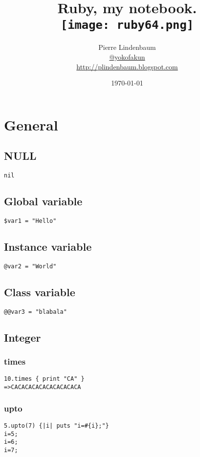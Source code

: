 \documentclass{article}
\date{\today}
\title{Ruby, my notebook.\\\texttt{[image: ruby64.png]}}
\author{Pierre Lindenbaum\\\href{https://twitter.com/yokofakun}{@yokofakun}\\\url{http://plindenbaum.blogspot.com} }
\begin{document}
\maketitle

\tableofcontents

\section{General}
\subsection{NULL}
\begin{lstlisting}
nil
\end{lstlisting}

\subsection{Global variable}
\begin{lstlisting}
$var1 = "Hello"
\end{lstlisting}
\subsection{Instance variable}
\begin{lstlisting}
@var2 = "World"
\end{lstlisting}

\subsection{Class variable}
\begin{lstlisting}
@@var3 = "blabala"
\end{lstlisting}

\subsection{Integer}
\subsubsection{times}
\begin{lstlisting}
10.times { print "CA" }
=>CACACACACACACACACACA
\end{lstlisting}
\subsubsection{upto}
\begin{lstlisting}
5.upto(7) {|i| puts "i=#{i};"}
i=5;
i=6;
i=7;
\end{lstlisting}
\end{document}
